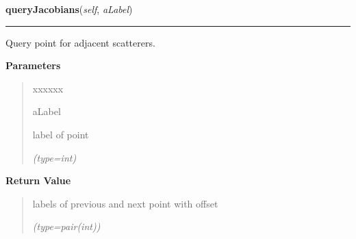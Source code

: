 \hspace{.8\funcindent}\begin{boxedminipage}{\funcwidth}

    \raggedright \textbf{queryJacobians}(\textit{self}, \textit{aLabel})

    \vspace{-1.5ex}

    \rule{\textwidth}{0.5\fboxrule}
\setlength{\parskip}{2ex}
    Query point for adjacent scatterers.

\setlength{\parskip}{1ex}
      \textbf{Parameters}
      \vspace{-1ex}

      \begin{quote}
        \begin{Ventry}{xxxxxx}

          \item[aLabel]

          label of point

            {\it (type=int)}

        \end{Ventry}

      \end{quote}

      \textbf{Return Value}
    \vspace{-1ex}

      \begin{quote}
      labels of previous and next point with offset

      {\it (type=pair(int))}

      \end{quote}

    \end{boxedminipage}

    \label{gblfit:GblTrajectory:addJacobians}

    \vspace{0.5ex}

